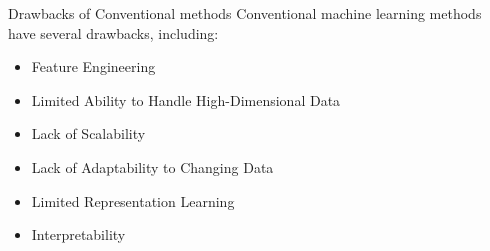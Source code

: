 \documentclass[10pt,aspectratio=169,dvipsnames]{beamer} %
\begin{document}
	\begin{frame}{Drawbacks of Conventional methods}
		Conventional machine learning methods have several drawbacks, including:
		\begin{itemize}
			\item Feature Engineering
			\item Limited Ability to Handle High-Dimensional Data
			\item Lack of Scalability
			\item Lack of Adaptability to Changing Data
			\item Limited Representation Learning
			\item Interpretability	
		\end{itemize}
	\end{frame}

\end{document}
